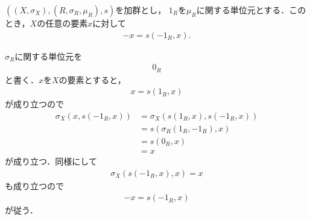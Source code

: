 	\begin{screen}
		\begin{thm}\label{thm:inverse_element_equals_to_its_minus}
			$\left((X,\sigma_X),(R,\sigma_R,\mu_R),s\right)$を加群とし，
			$1_R$を$\mu_R$に関する単位元とする．このとき，$X$の任意の要素$x$に対して
			\begin{align}
				-x = s\left(-1_R,x\right).
			\end{align}
		\end{thm}
	\end{screen}
	
	\begin{sketch}
		$\sigma_R$に関する単位元を
		\begin{align}
			0_R
		\end{align}
		と書く．$x$を$X$の要素とすると，
		\begin{align}
			x = s\left(1_R,x\right)
		\end{align}
		が成り立つので
		\begin{align}
			\sigma_X\left(x,s\left(-1_R,x\right)\right) &= \sigma_X\left(s\left(1_R,x\right),s\left(-1_R,x\right)\right) \\
			&= s\left(\sigma_R\left(1_R,-1_R\right),x\right) \\
			&= s\left(0_R,x\right) \\
			&= x
		\end{align}
		が成り立つ．同様にして
		\begin{align}
			\sigma_X\left(s\left(-1_R,x\right),x\right) = x
		\end{align}
		も成り立つので
		\begin{align}
			-x = s\left(-1_R,x\right)
		\end{align}
		が従う．
		\QED
	\end{sketch}
	
	\begin{screen}
		\begin{dfn}[加群準同型]
			
		\end{dfn}
	\end{screen}